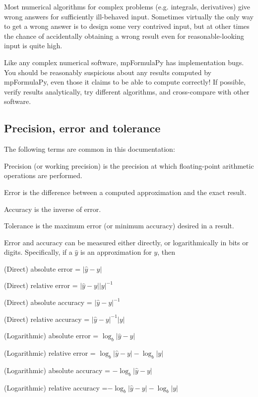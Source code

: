 \vpara
Most numerical algorithms for complex problems (e.g. integrals, derivatives) give wrong answers for sufficiently ill-behaved input. Sometimes virtually the only way to get a wrong answer is to design some very contrived input, but at other times the chance of accidentally obtaining a wrong result even for reasonable-looking input is quite high.

\vpara
Like any complex numerical software, mpFormulaPy has implementation bugs. You should be reasonably suspicious about any results computed by mpFormulaPy, even those it claims to be able to compute correctly! If possible, verify results analytically, try different algorithms, and cross-compare with other software.



\subsection{Precision, error and tolerance}

The following terms are common in this documentation:

\vpara
Precision (or working precision) is the precision at which floating-point arithmetic operations are performed.

\vpara
Error is the difference between a computed approximation and the exact result.

\vpara
Accuracy is the inverse of error.

\vpara
Tolerance is the maximum error (or minimum accuracy) desired in a result.

\vpara
Error and accuracy can be measured either directly, or logarithmically in bits or digits. Specifically, if a $\hat{y}$ is an approximation for $y$, then

\vpara
(Direct) absolute error = $|\hat{y} - y|$

(Direct) relative error = $|\hat{y} - y||y|^{-1}$

(Direct) absolute accuracy = $|\hat{y} - y|^{-1}$

(Direct) relative accuracy = $|\hat{y} - y|^{-1}|y|$

(Logarithmic) absolute error = $\log_b|\hat{y} - y|$

(Logarithmic) relative error = $\log_b|\hat{y} - y| - \log_b|y|$

(Logarithmic) absolute accuracy = $-\log_b|\hat{y} - y|$

(Logarithmic) relative accuracy =$-\log_b|\hat{y} - y| - \log_b|y|$

